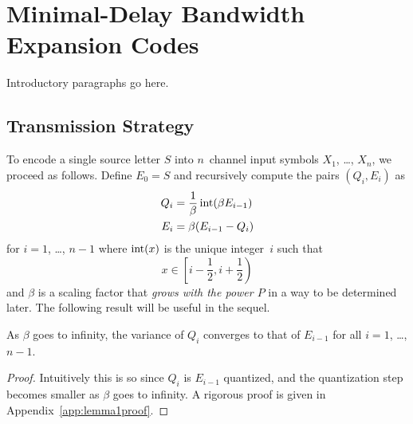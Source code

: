 \chapter{Minimal-Delay Bandwidth Expansion Codes}

Introductory paragraphs go here.

\section{Transmission Strategy}
\label{sec:commscheme}

To encode a single source letter $S$ into $n$~channel input symbols $X_1$,
\dots, $X_n$, we proceed as follows. Define $E_0 = S$ and recursively compute
the pairs $(Q_i, E_i)$ as
\begin{align}
  Q_i &= \frac{1}{\beta} \operatorname{int}(\beta E_{i-1}) \nonumber \\
  E_i &= \beta (E_{i-1} - Q_i) \label{eq:QEdef}
\end{align}
for $i = 1$, \dots, $n-1$ where $\operatorname{int}(x)$ is the unique integer~$i$ such that
\begin{equation*}
  x \in \left[ i - \frac12 , i + \frac12 \right)
\end{equation*}
and $\beta$ is a scaling factor that \emph{grows with the power $P$}
in a way to be determined later.  The following result will be useful in the
sequel.
\begin{lemma}
  \label{lem:qvarconvergence}
  As $\beta$ goes to infinity, the variance of $Q_i$ converges to that of
  $E_{i-1}$ for all $i = 1$, \dots, $n-1$. 
\end{lemma}

\begin{proof}
  Intuitively this is so since $Q_i$ is $E_{i-1}$ quantized, and the
  quantization step becomes smaller as $\beta$ goes to infinity.  A rigorous
  proof is given in Appendix~\ref{app:lemma1proof}.
\end{proof}

